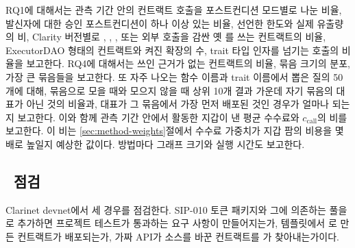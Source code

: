 RQ1에 대해서는 관측 기간 안의 컨트랙트 호출을 포스트컨디션 모드별로 나눈 비율, 발신자에 대한 승인 포스트컨디션이 하나 이상 있는 비율, 선언한 한도와 실제 유출량의 비, Clarity 버전별로 , , , 또는 외부 호출을 감싼 옛 를 쓰는 컨트랙트의 비율, ExecutorDAO 형태의 컨트랙트와 켜진 확장의 수, trait 타입 인자를 넘기는 호출의 비율을 보고한다. RQ4에 대해서는 쓰인 근거가 없는 컨트랙트의 비율, 묶음 크기의 분포, 가장 큰 묶음들을 보고한다. 또 자주 나오는 함수 이름과 trait 이름에서 뽑은 질의 50개에 대해, 묶음으로 모을 때와 모으지 않을 때 상위 10개 결과 가운데 자기 묶음의 대표가 아닌 것의 비율과, 대표가 그 묶음에서 가장 먼저 배포된 것인 경우가 얼마나 되는지 보고한다. 이와 함께 관측 기간 안에서 활동한 지갑이 낸 평균 수수료와 $c_{\mathrm{call}}$의 비를 보고한다. 이 비는 \ref{sec:method-weights}절에서 수수료 가중치가 지갑 팜의 비용을 몇 배로 높일지 예상한 값이다. 방법마다 그래프 크기와 실행 시간도 보고한다.

\subsection{\cpm\ 점검}

Clarinet devnet에서 세 경우를 점검한다. SIP-010 토큰 패키지와 그에 의존하는 풀을 로 추가하면 프로젝트 테스트가 통과하는 요구 사항이 만들어지는가, 템플릿에서 로 만든 컨트랙트가 배포되는가, 가짜 API가 소스를 바꾼 컨트랙트를 가 찾아내는가이다.
